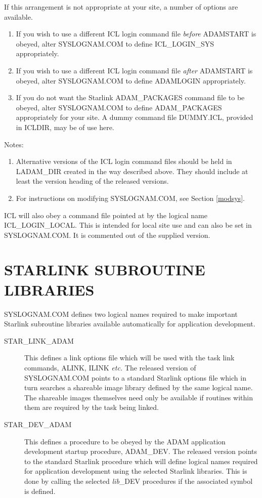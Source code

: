 If this arrangement is not appropriate at your site, a number of options are
available.
\begin{enumerate}
\item If you wish to use a different ICL login command file {\em before}
ADAMSTART is obeyed, alter SYSLOGNAM\-.COM to define ICL\-\_LOGIN\-\_SYS
appropriately.
\item If you wish to use a different ICL login command file {\em after}
ADAM\-START is obeyed, alter SYS\-LOGNAM\-.COM to define ADAM\-LOGIN
appropriately.
\item If you do not want the Starlink ADAM\-\_PACK\-AGES command file to be
obeyed, alter SYS\-LOG\-NAM.COM to define ADAM\-\_PACK\-AGES appropriately for
your site.
A dummy command file DUMMY\-.ICL, provided in ICLDIR, may be of use here.
\end{enumerate}

Notes:
\begin{enumerate}
\item Alternative versions of the ICL login command files should be held in
LADAM\_DIR created in the way described above.
They should include at least the version heading of the released versions.
\item For instructions on modifying SYSLOGNAM.COM, see Section \ref{modsys}.
\end{enumerate}

ICL will also obey a command file pointed at by the logical name
ICL\_LOGIN\_LOCAL.
This is intended for local site use and can also be set in SYSLOGNAM.COM.
It is commented out of the supplied version.

\section{STARLINK SUBROUTINE LIBRARIES}
\label{starlibs}
SYSLOGNAM.COM defines two logical names required to make important Starlink
subroutine libraries available automatically for application development.
\begin{description}
\item[STAR\_LINK\_ADAM] This defines a link options file which will be used
with the task link commands, ALINK, ILINK {\em etc.}
The released version of SYSLOGNAM.COM points to a standard Starlink options
file which in turn searches a shareable image library defined by the same
logical name. The shareable images themselves need only be available if routines within
them are required by the task being linked.
\item[STAR\_DEV\_ADAM] This defines a procedure to be obeyed by
the ADAM application development startup procedure, ADAM\_DEV.
The released version points to the standard Starlink procedure which will
define logical names required for application development using the selected
Starlink libraries.
This is done by calling the selected {\em lib}\_DEV procedures if the
associated symbol is defined.
\end{description}

